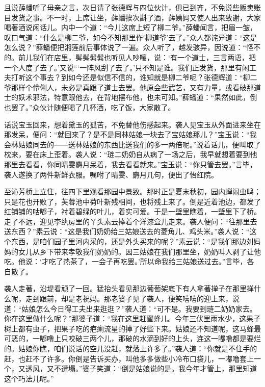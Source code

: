 \begin{parag}
    且说薛蟠听了母亲之言，次日请了张德辉与四位伙计，俱已到齐，不免说些贩卖账目发货之事。不一时，上席让坐，薛蟠挨次斟了酒，薛姨妈又使人出来致谢，大家喝著酒说闲话儿。内中一个道：“今儿这席上短了柳二爷。”薛蟠闻言，把眉一皱，叹口气道：“什么是柳二爷，如今不知那里作‘柳道爷’去了。”众人都诧异道：“这是怎么说？”薛蟠便把湘莲前后事体说了一遍。众人听了，越发骇异，因说道：“怪不的。前儿我们在店里，髣髣髴髴也听见人吵嚷，说：‘有一个道士，三言两语，把一个人度了去了。’又说“‘一阵风刮了去了。’只不知是谁。我们正发货，那里有闲工夫打听这个事去？到如今还是似信不信的，谁知就是柳二爷呢？张德辉道：“柳二爷那样个伶俐人，未必是真跟了道士去罢。他原会些武艺，又有力量，或看破那道士的妖术邪法，特意跟他去，在背地摆布他，也未可知。”薛蟠道：“果然如此，倒也罢了。”众伙计随便喝了几杯酒，吃了饭，大家散了。
\end{parag}


\begin{parag}
    话说宝玉回来，想着黛玉的孤苦，不免替他伤感起来。袭人见宝玉从外面进来坐在那发呆，便问：“就回来了？是不是同林姑娘一块去了宝姑娘那儿？”宝玉说：“我会林姑娘同去的——送林姑娘的东西比送我们的多一两倍呢。”说着话儿，便叫取了枕来，要在床上歪着。袭人说：“琏二奶奶自从病了一场之后，我早就想着要到他那里去看看，你同晴雯麝月呆着，我去看看就来。”宝玉说：“你只管去罢。”言毕，袭人遂换了两件新鲜衣服。嘱咐了晴雯、麝月几句，便出了怡红院。
\end{parag}


\begin{parag}
    至沁芳桥上立住，往四下里观看那园中景致。那时正是夏末秋初，园内蝉闹虫鸣；只是花也开败了，芙蓉池中荷叶新残相间，也将残上来了。倒是近着池边，都发了红铺铺的咕嘟子，衬着碧绿的叶儿，着实可爱。于是一壁里瞧着，一壁里下了桥。走了不远，迎见李纨房里的丫头素云捧着个洋漆盒儿走来。袭人便问：“往那里去送东西？”素云说：“这是我们奶奶给三姑娘送去的菱角儿、鸡头米。”袭人说：“这个东西，是咱们园子里河内采的，还是外头买来的呢？”素云说：“是我们那边刘妈妈的女儿从乡下带来孝敬我们奶奶的。因三姑娘在我们那里坐，奶奶叫人剥了让他吃。他说：‘才吃了热茶了，一会子再吃罢。’所以命我给三姑娘送过去。”言毕，各自散了。
\end{parag}


\begin{parag}
    袭人走著，沿堤看顽了一回。猛抬头看见那边葡萄架底下有人拿著掸子在那里掸什么呢，走到跟前，却是老祝妈。那老婆子见了袭人，便笑嘻嘻的迎上来，说道：“姑娘怎么今日得工夫出来逛逛？”袭人道：“可不是。我要到琏二奶奶家去。你在这里做什么呢？”那婆子道：“我在这里赶蜜蜂儿。今年三伏里雨水少，这果子树上都有虫子，把果子吃的疤瘌流星的掉了好些下来。姑娘还不知道呢，这马蜂最可恶的，一嘟噜上只咬破三两个儿，那破的水滴到好的上头，连这一嘟噜都是要烂的。姑娘你瞧，咱们说话的空儿没赶，就落上许多了。”袭人道：“你就是不住手的赶，也赶不了许多。你倒是告诉买办，叫他多多做些小冷布口袋儿，一嘟噜套上一个，又透风，又不遭塌。”婆子笑道：“倒是姑娘说的是。我今年才管上，那里知道这个巧法儿呢。”
\end{parag}


